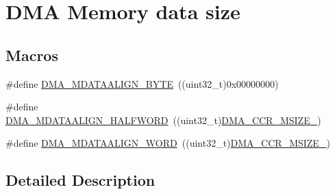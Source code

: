 \hypertarget{group___d_m_a___memory__data__size}{\section{D\-M\-A Memory data size}
\label{group___d_m_a___memory__data__size}
}
\subsection*{Macros}
\begin{DoxyCompactItemize}
\item 
\#define \hyperlink{group___d_m_a___memory__data__size_ga9ed07bddf736298eba11508382ea4d51}{D\-M\-A\-\_\-\-M\-D\-A\-T\-A\-A\-L\-I\-G\-N\-\_\-\-B\-Y\-T\-E}~((uint32\-\_\-t)0x00000000)
\item 
\#define \hyperlink{group___d_m_a___memory__data__size_ga2c7355971c0da34a7ffe50ec87403071}{D\-M\-A\-\_\-\-M\-D\-A\-T\-A\-A\-L\-I\-G\-N\-\_\-\-H\-A\-L\-F\-W\-O\-R\-D}~((uint32\-\_\-t)\hyperlink{group___peripheral___registers___bits___definition_ga600d3f8200fc42ea6e1c7c8abbd327ad}{D\-M\-A\-\_\-\-C\-C\-R\-\_\-\-M\-S\-I\-Z\-E\-\_})
\item 
\#define \hyperlink{group___d_m_a___memory__data__size_ga8812da819f18c873249074f3920220b2}{D\-M\-A\-\_\-\-M\-D\-A\-T\-A\-A\-L\-I\-G\-N\-\_\-\-W\-O\-R\-D}~((uint32\-\_\-t)\hyperlink{group___peripheral___registers___bits___definition_ga60b9958fbde96f69160ca7edf92d4c27}{D\-M\-A\-\_\-\-C\-C\-R\-\_\-\-M\-S\-I\-Z\-E\-\_})
\end{DoxyCompactItemize}


\subsection{Detailed Description}


